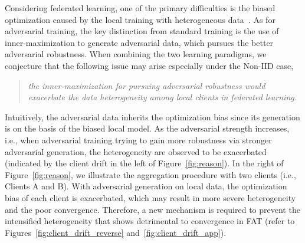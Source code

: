 \documentclass{article} %
\theoremstyle{plain}
\theoremstyle{definition}
\theoremstyle{remark}
\begin{document}
Considering federated learning, one of the primary difficulties is the biased optimization caused by the local training with heterogeneous data~\citep{zhao2018federated,li2018federated,lit2020federated}. As for adversarial training, the key distinction from standard training is the use of inner-maximization to generate adversarial data, which pursues the better adversarial robustness. When combining the two learning paradigms, we conjecture that the following issue may arise especially under the Non-IID case,
\vspace{-2mm}
\begin{quote}
\textit{the inner-maximization for pursuing adversarial robustness would exacerbate the data heterogeneity among local clients in federated learning.}
\end{quote}
\vspace{-2mm}
Intuitively, the adversarial data inherits the optimization bias since its generation is on the basis of the biased local model. As the adversarial strength increases, i.e., when adversarial training trying to gain more robustness via stronger adversarial generation, the heterogeneity are observed to be exacerbated (indicated by the client drift in the left of Figure~\ref{fig:reason}). In the right of Figure~\ref{fig:reason}, we illustrate the aggregation procedure with two clients (i.e., Clients A and B). With adversarial generation on local data, the optimization bias of each client is exacerbated, which may result in more severe heterogeneity and the poor convergence. Therefore, a new mechanism is required to prevent the intensified heterogeneity that shows detrimental to convergence in FAT (refer to Figures~\ref{fig:client_drift_reverse} and~\ref{fig:client_drift_app}).

\end{document}
